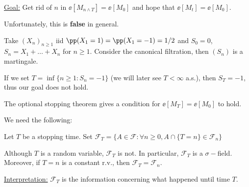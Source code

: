 \documentclass[../main.tex]{subfiles}
\begin{document}
\underline{Goal:} Get rid of $n$ in $\ee[M_{n \wedge T}] = \ee[M_0]$ and hope
that $\ee[M_t] = \ee[M_0]$.

Unfortunately, this is \textbf{false} in general.

\begin{example}
  Take $(X_n)_{n \geq 1}$ iid $\pp(X_1 = 1) = \pp(X_1 = -1) = 1/2 $ and $S_0 =
  0$, $S_n = X_1 + \ldots + X_n$ for $n \geq 1$. Consider the canonical
  filtration, then $(S_n)$ is a martingale.

  If we set $T = \inf \{ n \geq 1 \colon S_n = -1 \} $ (we will later see $T <
  \infty$ a.s.), then $S_T = -1$, thus our goal does not hold.
\end{example}

The optional stopping theorem gives a condition for $\ee[M_T] = \ee[M_0]$ to
hold.

\vspace{0.3em}
We need the following:
\begin{definition}
    Let $T$ be a stopping time. Set $\mathcal{F}_T = \{ A \in \mathcal{F} \colon
    \forall n \geq 0, A \cap \{ T = n \} \in \mathcal{F}_n\} $
\end{definition}
\begin{remark}
    Although $T$ is a random variable, $\mathcal{F}_T$ is not. In particular,
    $\mathcal{F}_T$ is a $\sigma-$field. Moreover, if $T = n$ is a constant
    r.v., then $\mathcal{F}_T = \mathcal{F}_n$.
\end{remark}    

\noindent
\underline{Interpretation:} $\mathcal{F}_T$ is the information concerning what
happened until time $T$.
\end{document}
